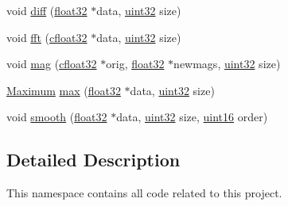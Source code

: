 \begin{DoxyCompactItemize}
void \hyperlink{namespaceavda_a3e9b92cfa9d76c4c363e8ed8a4c1a2ce}{diff} (\hyperlink{definitions_8hpp_aacdc525d6f7bddb3ae95d5c311bd06a1}{float32} $\ast$data, \hyperlink{definitions_8hpp_a1134b580f8da4de94ca6b1de4d37975e}{uint32} size)
\item 
void \hyperlink{namespaceavda_a33a1102422421212ac6b9387c896e864}{fft} (\hyperlink{definitions_8hpp_a960be6b6614c08090c16574dba10a421}{cfloat32} $\ast$data, \hyperlink{definitions_8hpp_a1134b580f8da4de94ca6b1de4d37975e}{uint32} size)
\item 
void \hyperlink{namespaceavda_a213bd6384fc9a330e4db2cecdbcd73ee}{mag} (\hyperlink{definitions_8hpp_a960be6b6614c08090c16574dba10a421}{cfloat32} $\ast$orig, \hyperlink{definitions_8hpp_aacdc525d6f7bddb3ae95d5c311bd06a1}{float32} $\ast$newmags, \hyperlink{definitions_8hpp_a1134b580f8da4de94ca6b1de4d37975e}{uint32} size)
\item 
\hyperlink{structMaximum}{Maximum} \hyperlink{namespaceavda_aa82021c3ee552773c060b1a39caf8aaa}{max} (\hyperlink{definitions_8hpp_aacdc525d6f7bddb3ae95d5c311bd06a1}{float32} $\ast$data, \hyperlink{definitions_8hpp_a1134b580f8da4de94ca6b1de4d37975e}{uint32} size)
\item 
void \hyperlink{namespaceavda_a22583ba7f11b69c955b13155bf9a739d}{smooth} (\hyperlink{definitions_8hpp_aacdc525d6f7bddb3ae95d5c311bd06a1}{float32} $\ast$data, \hyperlink{definitions_8hpp_a1134b580f8da4de94ca6b1de4d37975e}{uint32} size, \hyperlink{definitions_8hpp_a05f6b0ae8f6a6e135b0e290c25fe0e4e}{uint16} order)
\end{DoxyCompactItemize}


\subsection{Detailed Description}
This namespace contains all code related to this project. 

